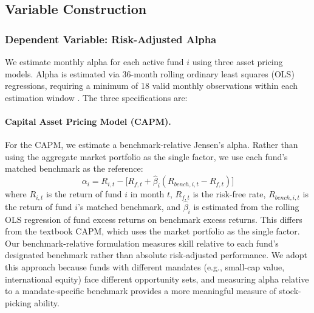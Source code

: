 \documentclass[11pt, a4paper]{article}
\begin{document}
\subsection{Variable Construction}
\label{subsec:variables}

\subsubsection{Dependent Variable: Risk-Adjusted Alpha}

We estimate monthly alpha for each active fund $i$ using three asset pricing models. Alpha is estimated via 36-month rolling ordinary least squares (OLS) regressions, requiring a minimum of 18 valid monthly observations within each estimation window \parencite{ferson1996}. The three specifications are:

\paragraph{Capital Asset Pricing Model (CAPM).} For the CAPM, we estimate a benchmark-relative Jensen's alpha. Rather than using the aggregate market portfolio as the single factor, we use each fund's matched benchmark as the reference:
\begin{equation}
    \alpha_{i} = R_{i,t} - \bigl[R_{f,t} + \hat{\beta}_{i}(R_{bench,i,t} - R_{f,t})\bigr]
    \label{eq:capm}
\end{equation}
where $R_{i,t}$ is the return of fund $i$ in month $t$, $R_{f,t}$ is the risk-free rate, $R_{bench,i,t}$ is the return of fund $i$'s matched benchmark, and $\hat{\beta}_{i}$ is estimated from the rolling OLS regression of fund excess returns on benchmark excess returns. This differs from the textbook CAPM, which uses the market portfolio as the single factor. Our benchmark-relative formulation measures skill relative to each fund's designated benchmark rather than absolute risk-adjusted performance. We adopt this approach because funds with different mandates (e.g., small-cap value, international equity) face different opportunity sets, and measuring alpha relative to a mandate-specific benchmark provides a more meaningful measure of stock-picking ability.
\end{document}
